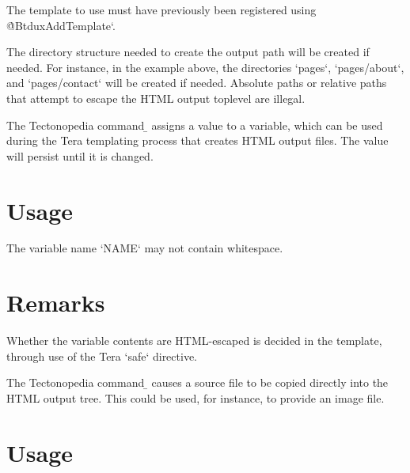 The template to use must have previously been registered using
\`@BtduxAddTemplate`.

The directory structure needed to create the output path will be created if
needed. For instance, in the example above, the directories \tex`pages`,
\tex`pages/about`, and \tex`pages/contact` will be created if needed. Absolute
paths or relative paths that attempt to escape the HTML output toplevel are
illegal.



The Tectonopedia command \b{\string\tduxSetTemplateVariable} assigns a value to
a variable, which can be used during the Tera templating process that creates
HTML output files. The value will persist until it is changed.

\section*{Usage}

\begin{texdisp}
\end{texdisp}

The variable name \tex`NAME` may not contain whitespace.

\section*{Remarks}

Whether the variable contents are HTML-escaped is decided in the template,
through use of the Tera \tex`safe` directive.



The Tectonopedia command \b{\string\tduxProvideFile} causes a source file to be
copied directly into the HTML output tree. This could be used, for instance, to
provide an image file.

\section*{Usage}

\begin{texdisp}
\end{texdisp}

